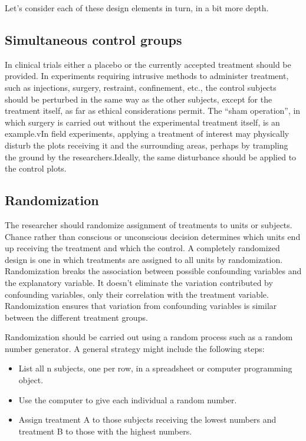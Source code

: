 \documentclass[]{book}
\providecommand{\tightlist}{%
  \setlength{\itemsep}{0pt}\setlength{\parskip}{0pt}}
\begin{document}
Let's consider each of these design elements in turn, in a bit more depth.

\hypertarget{simultaneous-control-groups}{%
\subsection{Simultaneous control groups}\label{simultaneous-control-groups}}

In clinical trials either a placebo or the currently accepted treatment should be provided. In experiments requiring intrusive methods to administer treatment, such as injections, surgery, restraint, confinement, etc., the control subjects should be perturbed in the same way as the other subjects, except for the treatment itself, as far as ethical considerations permit. The ``sham operation'', in which surgery is carried out without the experimental treatment itself, is an example.vIn field experiments, applying a treatment of interest may physically disturb the plots receiving it and the surrounding areas, perhaps by trampling the ground by the researchers.Ideally, the same disturbance should be applied to the control plots.

\hypertarget{randomization}{%
\subsection{Randomization}\label{randomization}}

The researcher should randomize assignment of treatments to units or subjects. Chance rather than conscious or unconscious decision determines which units end up receiving the treatment and which the control. A completely randomized design is one in which treatments are assigned to all units by randomization. Randomization breaks the association between possible confounding variables and the explanatory variable. It doesn't eliminate the variation contributed by confounding variables, only their correlation with the treatment variable. Randomization ensures that variation from confounding variables is similar between the different treatment groups.

Randomization should be carried out using a random process such as a random number generator. A general strategy might include the following steps:

\begin{itemize}
\tightlist
\item
  List all n subjects, one per row, in a spreadsheet or computer programming object.
\item
  Use the computer to give each individual a random number.
\item
  Assign treatment A to those subjects receiving the lowest numbers and treatment B to those with the highest numbers.
\end{itemize}
\end{document}

